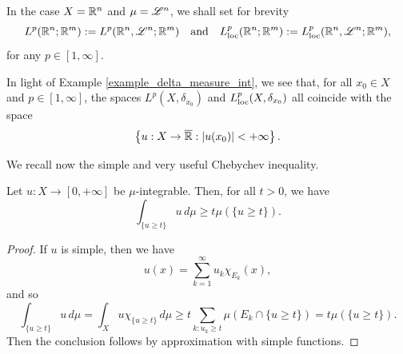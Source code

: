 In the case $X = \mathbb{R}^{n}$ and $\mu = \mathscr{L}^{n}$, we shall set for brevity 
\begin{equation*}
L^{p}(\mathbb{R}^{n}; \mathbb{R}^{m}) := L^{p}(\mathbb{R}^{n}, \mathscr{L}^{n}; \mathbb{R}^{m}) \quad \text{and} \quad L^{p}_{\rm loc}(\mathbb{R}^{n}; \mathbb{R}^{m}) := L^{p}_{\rm loc}(\mathbb{R}^{n}, \mathscr{L}^{n}; \mathbb{R}^{m}),
\end{equation*} 
for any $p \in [1, \infty]$.

\begin{example}
In light of Example \ref{example_delta_measure_int}, we see that, for all $x_{0} \in X$ and $p \in [1, \infty]$, the spaces $L^{p}(X, \delta_{x_{0}})$ and $L^{p}_{\rm loc}(X, \delta_{x_{0}})$ all coincide with the space
\begin{equation*}
\left \{ u : X \to \overline{\mathbb{R}} : |u(x_{0})| < + \infty \right \}.
\end{equation*}
\end{example}

We recall now the simple and very useful Chebychev inequality.

\begin{proposition} \label{prop:Cheb_ineq}
Let $u : X \to [0, + \infty]$ be $\mu$-integrable. Then, for all $t > 0$, we have
\begin{equation} \label{eq:Cheb_ineq}
\int_{\{u \ge t\}} u \, d \mu \ge t \mu(\{ u \ge t \}).
\end{equation}
\end{proposition}
\begin{proof}
If $u$ is simple, then we have
\begin{equation*}
u(x) = \sum_{k = 1}^{\infty} u_{k} \chi_{E_{k}}(x),
\end{equation*}
and so
\begin{equation*}
\int_{\{u \ge t\}} u \, d \mu = \int_{X} u \chi_{\{u \ge t\}} \, d \mu \ge t \sum_{k : u_{k} \ge t} \mu(E_{k} \cap \{ u \ge t \}) = t \mu(\{ u \ge t \}).
\end{equation*}
Then the conclusion follows by approximation with simple functions.
\end{proof}

